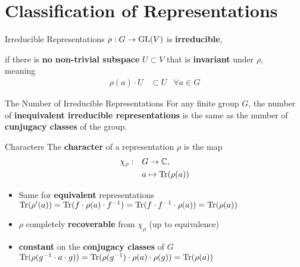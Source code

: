 
\section{Classification of Representations}

\begin{frame}{Irreducible Representations}
    \large
    $\rho: G \to \operatorname{GL}(V)$ is \textbf{irreducible},
    
    \pause
    if there is \textbf{no non-trivial subspace} $U \subset V$ that is \textbf{invariant} under $\rho$, \\
    meaning
    \begin{align*}
        \rho(a) \cdot U & \subset U & \forall a \in G
    \end{align*}

    \normalsize
    {\hspace*{\fill} \cite{hein2013}}

\end{frame}

\begin{frame}{The Number of Irreducible Representations}
    \large
    For any finite group $G$, the number of \textbf{inequivalent irreducible representations} is the same as the number of \textbf{cunjugacy classes} of the group.

    {\hspace*{\fill} \cite{fulton2013}}
    
\end{frame}

\begin{frame}{Characters}
    \large
    The \textbf{character} of a representation $\rho$ is the map
    \Large
    \begin{align*}
        \chi_\rho: \quad & G \to \mathbb{C}, \\
        & a \mapsto \operatorname{Tr}(\rho(a))
    \end{align*}
    
    \pause
    \large
    \begin{itemize}
        \item Same for \textbf{equivalent} representations
            \hspace*{\fill} $\operatorname{Tr}(\rho'(a)) = \operatorname{Tr}(f \cdot \rho(a) \cdot f^{-1}) = \operatorname{Tr}(f \cdot f^{-1} \cdot \rho(a)) = \operatorname{Tr}(\rho(a))$ \pause
        \item $\rho$ completely \textbf{recoverable} from $\chi_\rho$ (up to equivalence) \pause
        \item \textbf{constant} on the \textbf{conjugacy classes} of $G$
            \hspace*{\fill} $\operatorname{Tr}(\rho(g^{-1} \cdot a \cdot g)) = \operatorname{Tr}(\rho(g^{-1}) \cdot \rho(a) \cdot \rho(g)) = \operatorname{Tr}(\rho(a))$
    \end{itemize}

    \normalsize
    {\hspace*{\fill} \cite{fulton2013}}
    
\end{frame}

